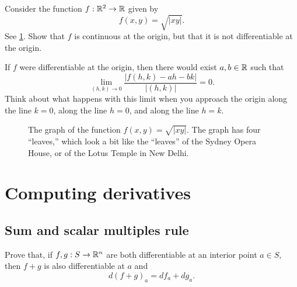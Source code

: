 \begin{exercise} \label{continuous-not-differentiable}
	Consider the function $f : \mathbb{R}^2 \to \mathbb{R}$ given by \[ f(x,y) = \sqrt{|xy|}. \]
	See \cref{sqrt-x-y-graph}. Show that $f$ is continuous at the origin, but that it is not differentiable at the origin. 
	\begin{hint}
		If $f$ were differentiable at the origin, then there would exist $a, b \in \mathbb{R}$ such that 
		\[ \lim_{(h,k) \to 0} \frac{|f(h,k) - ah -  bk|}{|(h,k)|} = 0. \]
		Think about what happens with this limit when you approach the origin along the line $k = 0$, along the line $h = 0$, and along the line $h = k$.
	\end{hint}
	\begin{figure}[ht]
		\begin{center}
		\end{center}
		\caption{The graph of the function  $f(x,y) = \sqrt{|xy|}$. The graph has four ``leaves,'' which look a bit like the ``leaves'' of the Sydney Opera House, or of the Lotus Temple in New Delhi.} \label{sqrt-x-y-graph}
	\end{figure}
\end{exercise}

\section{Computing derivatives}

\subsection{Sum and scalar multiples rule} 

\begin{exercise} \label{sum-rule} 
	Prove that, if $f, g : S \to \mathbb{R}^n$ are both differentiable at an interior point $a \in S$, then $f + g$ is also differentiable at $a$ and \[ d(f+g)_a = df_a + dg_a. \]
\end{exercise}

